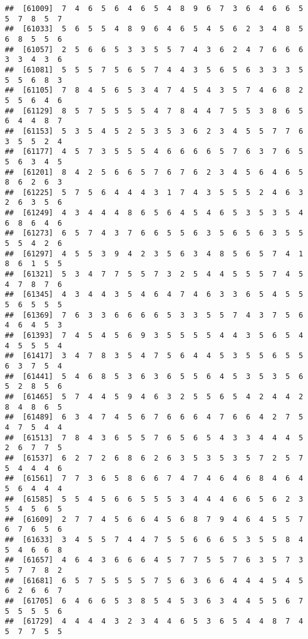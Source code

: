 \documentclass[
]{book}
\begin{document}
\begin{verbatim}
##  [61009]  7  4  6  5  6  4  6  5  4  8  9  6  7  3  6  4  6  6  5  5  7  8  5  7
##  [61033]  5  6  5  5  4  8  9  6  4  6  5  4  5  6  2  3  4  8  5  6  8  5  5  6
##  [61057]  2  5  6  6  5  3  3  5  5  7  4  3  6  2  4  7  6  6  6  3  3  4  3  6
##  [61081]  5  5  5  7  5  6  5  7  4  4  3  5  6  5  6  3  3  3  5  5  5  6  8  3
##  [61105]  7  8  4  5  6  5  3  4  7  4  5  4  3  5  7  4  6  8  2  5  5  6  4  6
##  [61129]  8  5  7  5  5  5  5  4  7  8  4  4  7  5  5  3  8  6  5  6  4  4  8  7
##  [61153]  5  3  5  4  5  2  5  3  5  3  6  2  3  4  5  5  7  7  6  3  5  5  2  4
##  [61177]  4  5  7  3  5  5  5  4  6  6  6  6  5  7  6  3  7  6  5  5  6  3  4  5
##  [61201]  8  4  2  5  6  6  5  7  6  7  6  2  3  4  5  6  4  6  5  8  6  2  6  3
##  [61225]  5  7  5  6  4  4  4  3  1  7  4  3  5  5  5  2  4  6  3  2  6  3  5  6
##  [61249]  4  3  4  4  4  8  6  5  6  4  5  4  6  5  3  5  3  5  4  6  8  6  4  6
##  [61273]  6  5  7  4  3  7  6  6  5  5  6  3  5  6  5  6  3  5  5  5  5  4  2  6
##  [61297]  4  5  5  3  9  4  2  3  5  6  3  4  8  5  6  5  7  4  1  8  6  1  5  5
##  [61321]  5  3  4  7  7  5  5  7  3  2  5  4  4  5  5  5  7  4  5  4  7  8  7  6
##  [61345]  4  3  4  4  3  5  4  6  4  7  4  6  3  3  6  5  4  5  5  5  6  5  5  5
##  [61369]  7  6  3  3  6  6  6  6  5  3  3  5  5  7  4  3  7  5  6  4  6  4  5  3
##  [61393]  7  4  5  4  5  6  9  3  5  5  5  5  4  4  3  5  6  5  4  4  5  5  5  4
##  [61417]  3  4  7  8  3  5  4  7  5  6  4  4  5  3  5  5  6  5  5  6  3  7  5  4
##  [61441]  5  4  6  8  5  3  6  3  6  5  5  6  4  5  3  5  3  5  6  5  2  8  5  6
##  [61465]  5  7  4  4  5  9  4  6  3  2  5  5  6  5  4  2  4  4  2  8  4  8  6  5
##  [61489]  6  3  4  7  4  5  6  7  6  6  6  4  7  6  6  4  2  7  5  4  7  5  4  4
##  [61513]  7  8  4  3  6  5  5  7  6  5  6  5  4  3  3  4  4  4  5  2  6  7  7  5
##  [61537]  6  2  7  2  6  8  6  2  6  3  5  3  5  3  5  7  2  5  7  5  4  4  4  6
##  [61561]  7  7  3  6  5  8  6  6  7  4  7  4  6  4  6  8  4  6  4  5  6  4  4  4
##  [61585]  5  5  4  5  6  6  5  5  5  3  4  4  4  6  6  5  6  2  3  5  4  5  6  5
##  [61609]  2  7  7  4  5  6  6  4  5  6  8  7  9  4  6  4  5  5  7  6  7  6  5  6
##  [61633]  3  4  5  5  7  4  4  7  5  5  6  6  6  5  3  5  5  8  4  5  4  6  6  8
##  [61657]  4  6  4  3  6  6  6  4  5  7  7  5  5  7  6  3  5  7  3  5  7  7  8  2
##  [61681]  6  5  7  5  5  5  5  7  5  6  3  6  6  4  4  4  5  4  5  6  2  6  6  7
##  [61705]  6  4  6  6  5  3  8  5  4  5  3  6  3  4  4  5  5  6  7  5  5  5  5  6
##  [61729]  4  4  4  4  3  2  3  4  4  6  5  3  6  5  4  4  8  7  4  5  7  7  5  5

\end{verbatim}
\end{document}
